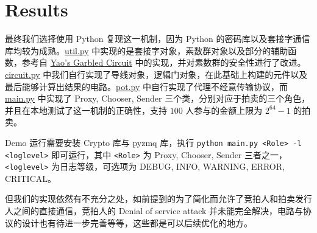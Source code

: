 \section{Results}

最终我们选择使用 Python 复现这一机制，因为 Python 的密码库以及套接字通信库均较为成熟。\href{https://github.com/shadowash0215/Privacy-Preserving-Auctions/blob/master/src/util.py}{util.py} 中实现的是套接字对象，素数群对象以及部分的辅助函数，参考自 \href{https://github.com/ojroques/garbled-circuit}{Yao's Garbled Circuit} 中的实现，并对素数群的安全性进行了改进。\href{https://github.com/shadowash0215/Privacy-Preserving-Auctions/blob/master/src/circuit.py}{circuit.py} 中我们自行实现了导线对象，逻辑门对象，在此基础上构建的元件以及最后能够计算出结果的电路。\href{https://github.com/shadowash0215/Privacy-Preserving-Auctions/blob/master/src/pot.py}{pot.py} 中自行实现了代理不经意传输协议，而 \href{https://github.com/shadowash0215/Privacy-Preserving-Auctions/blob/master/src/main.py}{main.py} 中实现了 Proxy, Chooser, Sender 三个类，分别对应于拍卖的三个角色，并且在本地测试了这一机制的正确性，支持 $100$ 人参与的金额上限为 $2^{64} - 1$ 的拍卖。 

Demo 运行需要安装 Crypto 库与 pyzmq 库，执行 \verb|python main.py <Role> -l <loglevel>| 即可运行，其中 \verb|<Role>| 为 Proxy, Chooser, Sender 三者之一，\verb|<loglevel>| 为日志等级，可选项为 DEBUG, INFO, WARNING, ERROR, CRITICAL。

但我们的实现依然有不充分之处，如前提到的为了简化而允许了竞拍人和拍卖发行人之间的直接通信，竞拍人的 Denial of service attack 并未能完全解决，电路与协议的设计也有待进一步完善等等，这些都是可以后续优化的地方。